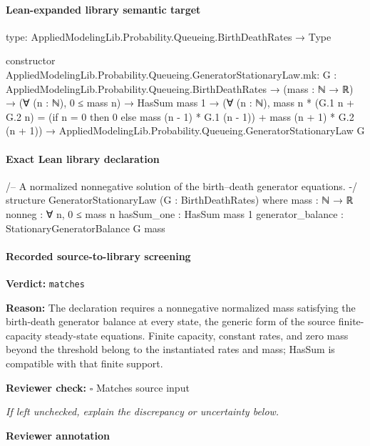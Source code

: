 \documentclass[10pt]{article}
\newcommand{\reviewerbox}{%
  \par\noindent\fbox{\parbox{0.96\linewidth}{\rule{0pt}{0.38in}}}\par
}
\newcommand{\reviewmatch}[1]{%
  \par\noindent\textbf{Reviewer check:} $\square$\; #1\par
  \noindent\emph{If left unchecked, explain the discrepancy or uncertainty below.}\par
}
\begin{document}
\paragraph{Lean-expanded library semantic target}
\begin{ReviewVerbatim}
type:
AppliedModelingLib.Probability.Queueing.BirthDeathRates → Type

constructor AppliedModelingLib.Probability.Queueing.GeneratorStationaryLaw.mk:
{G : AppliedModelingLib.Probability.Queueing.BirthDeathRates} →
  (mass : ℕ → ℝ) →
    (∀ (n : ℕ), 0 ≤ mass n) →
      HasSum mass 1 →
        (∀ (n : ℕ),
            mass n * (G.1 n + G.2 n) = (if n = 0 then 0 else mass (n - 1) * G.1 (n - 1)) + mass (n + 1) * G.2 (n + 1)) →
          AppliedModelingLib.Probability.Queueing.GeneratorStationaryLaw G
\end{ReviewVerbatim}

\paragraph{Exact Lean library declaration}
\begin{ReviewVerbatim}
/-- A normalized nonnegative solution of the birth--death generator equations. -/
structure GeneratorStationaryLaw (G : BirthDeathRates) where
  mass : ℕ → ℝ
  nonneg : ∀ n, 0 ≤ mass n
  hasSum_one : HasSum mass 1
  generator_balance : StationaryGeneratorBalance G mass
\end{ReviewVerbatim}

\paragraph{Recorded source-to-library screening}
\textbf{Verdict:} \texttt{matches}
\\
{\raggedright
\textbf{Reason:} The declaration requires a nonnegative normalized mass satisfying the birth-\allowbreak{}death generator balance at every state, the generic form of the source finite-\allowbreak{}capacity steady-\allowbreak{}state equations.\allowbreak{} Finite capacity, constant rates, and zero mass beyond the threshold belong to the instantiated rates and mass;\allowbreak{} HasSum is compatible with that finite support.\allowbreak{}
\par}
\reviewmatch{Matches source input}
\noindent\textbf{Reviewer annotation}\par
\reviewerbox

\clearpage
\hypertarget{source-claim-29ef69554178a434}{}
\hypertarget{source-section-f10b5f68e4acf3dc}{}
\end{document}
